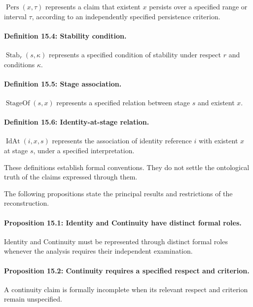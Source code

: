 \(\operatorname{Pers}(x,\tau)\)
represents a claim that
existent \(x\) persists
over a specified range
or interval \(\tau\),
according to an independently
specified persistence
criterion.

\paragraph{Definition 15.4: Stability condition.}

\(\operatorname{Stab}_{r}(s,\kappa)\)
represents a specified
condition of stability
under respect \(r\)
and conditions \(\kappa\).

\paragraph{Definition 15.5: Stage association.}

\(\operatorname{StageOf}(s,x)\)
represents a specified
relation between stage
\(s\) and existent \(x\).

\paragraph{Definition 15.6: Identity-at-stage relation.}

\(\operatorname{IdAt}(i,x,s)\)
represents the association
of identity reference
\(i\) with existent \(x\)
at stage \(s\), under
a specified interpretation.

These definitions establish
formal conventions. They
do not settle the
ontological truth of
the claims expressed
through them.

The following propositions
state the principal results
and restrictions of the
reconstruction.

\paragraph{Proposition 15.1: Identity and Continuity have distinct formal roles.}

Identity and Continuity
must be represented
through distinct formal
roles whenever the
analysis requires their
independent examination.

\paragraph{Proposition 15.2: Continuity requires a specified respect and criterion.}

A continuity claim is
formally incomplete when
its relevant respect
and criterion remain
unspecified.

